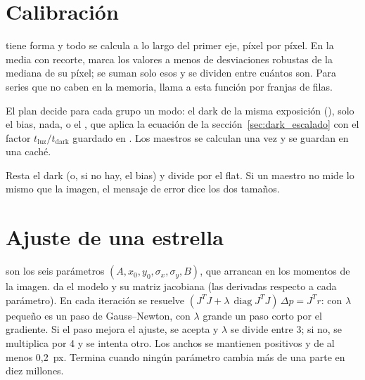 \section{Calibración}


 tiene forma  y todo se calcula a lo largo del primer eje, píxel por píxel. En la
media con recorte,  marca los valores a menos de  desviaciones robustas de la mediana de su
píxel; se suman solo esos y se dividen entre cuántos son. Para series que no caben en la memoria, 
llama a esta función por franjas de filas.


El plan decide para cada grupo un modo: el dark de la misma exposición (), solo el bias, nada, o el
, que aplica la ecuación de la sección~\ref{sec:dark_escalado} con el factor $t_\text{luz}/t_\text{dark}$
guardado en . Los maestros se calculan una vez y se guardan en una caché.


Resta el dark (o, si no hay, el bias) y divide por el flat. Si un maestro no mide lo mismo que la imagen, el mensaje de
error dice los dos tamaños.

\section{Ajuste de una estrella}\label{sec:codigo_gauss}


 son los seis parámetros $(A, x_0, y_0, \sigma_x, \sigma_y, B)$, que arrancan en los momentos de la imagen.
 da el modelo y su matriz jacobiana (las derivadas respecto a cada parámetro). En cada iteración se
resuelve $(J^TJ + \lambda\,\operatorname{diag}J^TJ)\,\Delta p = J^T r$: con $\lambda$ pequeño es un paso de Gauss–Newton,
con $\lambda$ grande un paso corto por el gradiente. Si el paso mejora el ajuste, se acepta y $\lambda$ se divide entre 3;
si no, se multiplica por 4 y se intenta otro. Los anchos se mantienen positivos y de al menos 0,2~px. Termina cuando ningún
parámetro cambia más de una parte en diez millones.

